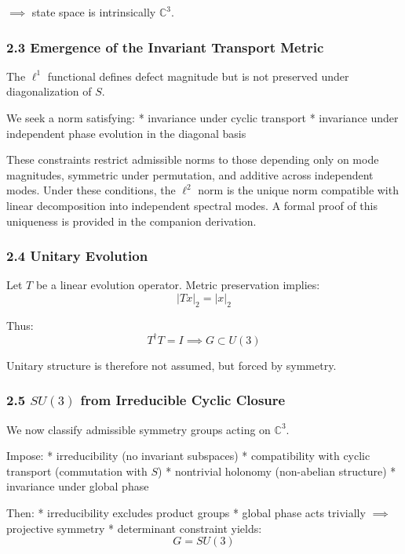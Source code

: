 \documentclass[
]{article}
\begin{document}
\(\implies\) state space is intrinsically \(\mathbb{C}^3\).

\hypertarget{emergence-of-the-invariant-transport-metric}{%
\subsubsection{2.3 Emergence of the Invariant Transport
Metric}\label{emergence-of-the-invariant-transport-metric}}

The \(\ell^1\) functional defines defect magnitude but is not preserved
under diagonalization of \(S\).

We seek a norm satisfying: * invariance under cyclic transport *
invariance under independent phase evolution in the diagonal basis

These constraints restrict admissible norms to those depending only on
mode magnitudes, symmetric under permutation, and additive across
independent modes. Under these conditions, the \(\ell^2\) norm is the
unique norm compatible with linear decomposition into independent
spectral modes. A formal proof of this uniqueness is provided in the
companion derivation.

\hypertarget{unitary-evolution}{%
\subsubsection{2.4 Unitary Evolution}\label{unitary-evolution}}

Let \(T\) be a linear evolution operator. Metric preservation implies:
\[|Tx|_2 = |x|_2\]

Thus: \[T^\dagger T = I \implies G \subset U(3)\]

Unitary structure is therefore not assumed, but forced by symmetry.

\hypertarget{su3-from-irreducible-cyclic-closure}{%
\subsubsection{\texorpdfstring{2.5 \(SU(3)\) from Irreducible Cyclic
Closure}{2.5 SU(3) from Irreducible Cyclic Closure}}\label{su3-from-irreducible-cyclic-closure}}

We now classify admissible symmetry groups acting on \(\mathbb{C}^3\).

Impose: * irreducibility (no invariant subspaces) * compatibility with
cyclic transport (commutation with \(S\)) * nontrivial holonomy
(non-abelian structure) * invariance under global phase

Then: * irreducibility excludes product groups * global phase acts
trivially \(\implies\) projective symmetry * determinant constraint
yields: \[G = SU(3)\]
\end{document}
